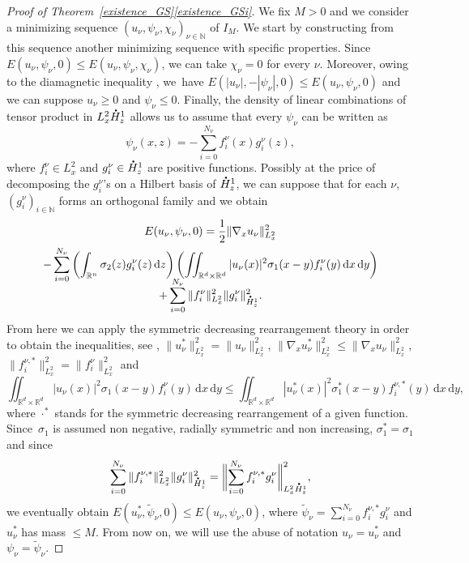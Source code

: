 \documentclass[10pt]{amsart}
\theoremstyle{definition}
\newcommand*{\overbigdot}[1]{%
\accentset{\mbox{\large\bfseries .}}{#1}}
\newenvironment{ProofOf}[1]{\begin{proof}[Proof of #1]}{\end{proof}}
\newcommand{\R}{\mathbb{R}}
\newcommand{\ud}{\, {\mathrm{d}}}
\begin{document}
\begin{ProofOf}{Theorem~\ref{existence_GS}\eqref{existence_GSi}}
We fix $M>0$ and we consider a minimizing sequence $(u_{\nu},\psi_{\nu},\chi_{\nu})_{\nu\in\mathbb N}$ of $I_{M}$. We start by constructing from this sequence another minimizing sequence with specific properties. Since $E(u_{\nu},\psi_{\nu},0)\leq E(u_{\nu},\psi_{\nu},\chi_{\nu})$, we can take $\chi_{\nu}=0$ for every $\nu$. Moreover, owing to
the diamagnetic inequality \cite[Th.\,7.21]{LL}, we~have
$E(|u_{\nu}|,-|\psi_{\nu}|,0)\leq E(u_{\nu},\psi_{\nu},0)$ and we can suppose $u_{\nu}\geq 0$ and $\psi_{\nu}\leq 0$. Finally, the density of linear combinations of tensor product in $L_{x}^{2}\overbigdot{H}_{z}^{1}$ allows us to assume that every $\psi_{\nu}$ can be written as\vspace*{-3pt}
\[
\psi_{\nu}(x,z)=-\sum\limits_{i=0}^{N_{\nu}}f_{i}^{\nu}(x)g_{i}^{\nu}(z),
\]
where $f_{i}^{\nu}\in L_{x}^{2}$ and $g_{i}^{\nu}\in\overbigdot{H}_{z}^{1}$ are positive functions.
Possibly at the price of decomposing the
$g_{i}^{\nu}$'s on a Hilbert basis of $\overbigdot{H}_{z}^{1}$, we can suppose that for each $\nu$, $(g_{i}^{\nu})_{i\in \mathbb N}$ forms an orthogonal family and we obtain\vspace*{-8pt}
\begin{multline*}
E(u_{\nu},\psi_{\nu},0)=\frac{1}{2}\|\nabla_{x}u_{\nu}\|_{L_{x}^{2}}^{2}\\
-\sum\limits_{i=0}^{N_{\nu}}\left(\int_{\R^{n}}\sigma_{2}(z)g_{i}^{\nu}(z)\ud z\right)\left(\iint_{\R^{d}\times\R^{d}}|u_{\nu}(x)|^{2}\sigma_{1}(x-y)f_{i}^{\nu}(y)\ud x\ud y\right)\\[
-8pt]
+\sum\limits_{i=0}^{N_{\nu}}\|f_{i}^{\nu}\|_{L_{x}^{2}}^{2}\|g_{i}^{\nu}\|_{\overbigdot{H}_{z}^{1}}^{2}.
\end{multline*}
From here we can apply the symmetric decreasing rearrangement theory in order to obtain the inequalities, see \cite[Chap.\,3]{LL}, $\|u_{\nu}^{*}\|_{L_{x}^{2}}^{2}=\|u_{\nu}\|_{L_{x}^{2}}^{2}$,
$\|\nabla_{x}u_{\nu}^{*}\|_{L_{x}^{2}}^{2}\leq\|\nabla_{x}u_{\nu}\|_{L_{x}^{2}}^{2}$, $\|f_{i}^{\nu,*}\|_{L_{x}^{2}}^{2}=\|f_{i}^{\nu}\|_{L_{x}^{2}}^{2}$ and\vspace*{-3pt}
\[
\iint_{\R^{d}\times\R^{d}}|u_{\nu}(x)|^{2}\sigma_{1}(x-y)f_{i}^{\nu}(y)\ud x\ud y\leq \iint_{\R^{d}\times\R^{d}}|u_{\nu}^{*}(x)|^{2}\sigma_{1}^{*}(x-y)f_{i}^{\nu,*}(y)\ud x\ud y,
\]
where $\cdot^{*}$ stands for the symmetric decreasing rearrangement of a given function. Since~$\sigma_{1}$ is assumed non negative, radially symmetric and non increasing, $\sigma_{1}^{*}=\sigma_{1}$ and since\vspace*{-5pt}
\[
\sum\limits_{i=0}^{N_{\nu}}\|f_{i}^{\nu,*}\|_{L_{x}^{2}}^{2}\|g_{i}^{\nu}\|_{\overbigdot{H}_{z}^{1}}^{2}=\biggl\|\sum\limits_{i=0}^{N_{\nu}}f_{i}^{\nu,*}g_{i}^{\nu}\biggr\|_{L_{x}^{2}\overbigdot{H}_{z}^{1}}^{2},
\]
we eventually obtain $E(u_{\nu}^{*},\widetilde{\psi}_{\nu},0)\leq E(u_{\nu},\psi_{\nu},0)$,
where $\widetilde{\psi}_{\nu}=\sum_{i=0}^{N_{\nu}}f_{i}^{\nu,*}g_{i}^{\nu}$
and $u_{\nu}^{*}$ has mass $\leq M$. From now on, we will use the abuse of notation $u_{\nu}=u_{\nu}^{*}$ and $\psi_{\nu}=\widetilde{\psi}_{\nu}$.


\end{ProofOf}
\end{document}
